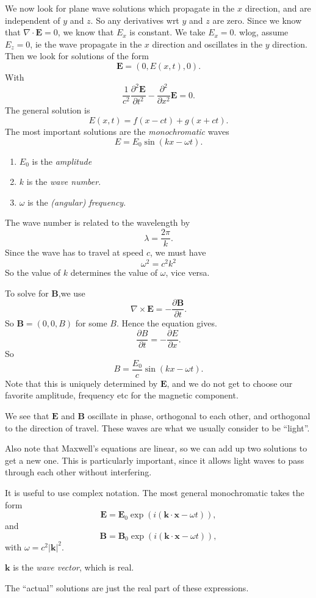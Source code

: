 \documentclass[a4paper]{article}
\begin{document}
We now look for plane wave solutions which propagate in the $x$ direction, and are independent of $y$ and $z$. So any derivatives wrt $y$ and $z$ are zero. Since we know that $\nabla \cdot \mathbf{E} = 0$, we know that $E_x$ is constant. We take $E_x = 0$. wlog, assume $E_z = 0$, ie the wave propagate in the $x$ direction and oscillates in the $y$ direction. Then we look for solutions of the form
\[
  \mathbf{E} = (0, E(x, t), 0).
\]
With
\[
  \frac{1}{c^2}\frac{\partial^2 \mathbf{E}}{\partial t^2} - \frac{\partial^2}{\partial x^2}\mathbf{E} = 0.
\]
The general solution is
\[
  E(x, t) = f(x - ct) + g(x + ct).
\]
The most important solutions are the \emph{monochromatic} waves
\[
  E = E_0 \sin (kx - \omega t).
\]
\begin{defi}\leavevmode
  \begin{enumerate}
    \item $E_0$ is the \emph{amplitude}
    \item $k$ is the \emph{wave number}.
    \item $\omega$ is the \emph{(angular) frequency}.
  \end{enumerate}
  The wave number is related to the wavelength by
  \[
    \lambda = \frac{2\pi}{k}.
  \]
  Since the wave has to travel at speed $c$, we must have
  \[
    \omega^2 = c^2 k^2
  \]
  So the value of $k$ determines the value of $\omega$, vice versa.
\end{defi}
To solve for $\mathbf{B}$,we use
\[
  \nabla\times \mathbf{E} = -\frac{\partial \mathbf{B}}{\partial t}.
\]
So $\mathbf{B} = (0, 0, B)$ for some $B$. Hence the equation gives.
\[
  \frac{\partial B}{\partial t} = -\frac{\partial E}{\partial x}.
\]
So
\[
  B = \frac{E_0}{c}\sin(kx - \omega t).
\]
Note that this is uniquely determined by $\mathbf{E}$, and we do not get to choose our favorite amplitude, frequency etc for the magnetic component.

We see that $\mathbf{E}$ and $\mathbf{B}$ oscillate in phase, orthogonal to each other, and orthogonal to the direction of travel. These waves are what we usually consider to be ``light''.

Also note that Maxwell's equations are linear, so we can add up two solutions to get a new one. This is particularly important, since it allows light waves to pass through each other without interfering.

It is useful to use complex notation. The most general monochromatic takes the form
\[
  \mathbf{E} = \mathbf{E}_0 \exp(i(\mathbf{k}\cdot \mathbf{x} - \omega t)),
\]
and
\[
  \mathbf{B} = \mathbf{B}_0 \exp(i(\mathbf{k}\cdot \mathbf{x} - \omega t)),
\]
with $\omega = c^2 |\mathbf{k}|^2$.
\begin{defi}
  $\mathbf{k}$ is the \emph{wave vector}, which is real.
\end{defi}
The ``actual'' solutions are just the real part of these expressions.
\end{document}
